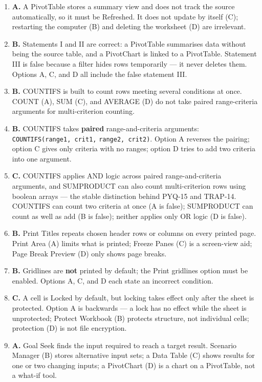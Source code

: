 \begin{enumerate}[label=\textbf{Q\arabic*.}, leftmargin=*]
  Rows, Columns, Values, and Filters; ``Insert'' (D) is not one of them. Rows
  (A), Columns (B), and Values (C) are all genuine areas.
\item \textbf{A.} A PivotTable stores a summary view and does not track the
  source automatically, so it must be Refreshed. It does not update by itself
  (C); restarting the computer (B) and deleting the worksheet (D) are
  irrelevant.
\item \textbf{B.} Statements I and II are correct: a PivotTable summarises data
  without being the source table, and a PivotChart is linked to a PivotTable.
  Statement III is false because a filter hides rows temporarily --- it never
  deletes them. Options A, C, and D all include the false statement III.
\item \textbf{B.} COUNTIFS is built to count rows meeting several conditions at
  once. COUNT (A), SUM (C), and AVERAGE (D) do not take paired range-criteria
  arguments for multi-criterion counting.
\item \textbf{B.} COUNTIFS takes \textbf{paired} range-and-criteria arguments:
  \texttt{COUNTIFS(range1, crit1,} \texttt{range2, crit2)}. Option A reverses the
  pairing;
  option C gives only criteria with no ranges; option D tries to add two
  criteria into one argument.
\item \textbf{C.} COUNTIFS applies AND logic across paired range-and-criteria
  arguments, and SUMPRODUCT can also count multi-criterion rows using boolean
  arrays --- the stable distinction behind PYQ-15 and TRAP-14. COUNTIFS can
  count two criteria at once (A is false); SUMPRODUCT can count as well as add
  (B is false); neither applies only OR logic (D is false).
\item \textbf{B.} Print Titles repeats chosen header rows or columns on every
  printed page. Print Area (A) limits what is printed; Freeze Panes (C) is a
  screen-view aid; Page Break Preview (D) only shows page breaks.
\item \textbf{B.} Gridlines are \textbf{not} printed by default; the Print
  gridlines option must be enabled. Options A, C, and D each state an incorrect
  condition.
\item \textbf{C.} A cell is Locked by default, but locking takes effect only
  after the sheet is protected. Option A is backwards --- a lock has no effect
  while the sheet is unprotected; Protect Workbook (B) protects structure, not
  individual cells; protection (D) is not file encryption.
\item \textbf{A.} Goal Seek finds the input required to reach a target result.
  Scenario Manager (B) stores alternative input sets; a Data Table (C) shows
  results for one or two changing inputs; a PivotChart (D) is a chart on a
  PivotTable, not a what-if tool.


\end{enumerate}
